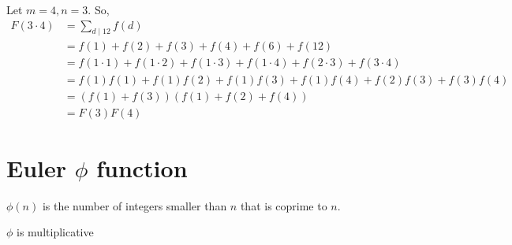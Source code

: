 \begin{eg}
	Let $m = 4, n = 3$. So,
	\begin{align*}
		F(3 \cdot 4) &= \sum_{d \mid 12} f(d)\\
			     &=  f(1) + f(2) + f(3) + f(4) +  f(6) + f(12)\\
			     &= f(1 \cdot 1) + f(1 \cdot 2) + f(1 \cdot 3) + f(1\cdot 4) +  f(2 \cdot 3) + f(3 \cdot 4)\\ 
			     &= f(1) f(1) + f(1) f( 2) + f(1) f(3) + f(1) f(4) +  f(2) f(3) + f(3) f(4)\\ 
			     &= (f(1) + f(3)) (f(1) + f(2) + f(4))\\
			     &= F(3) F(4)
	\end{align*}
\end{eg}


\section{Euler $\phi$ function}
$\phi(n)$ is the number of integers smaller than $n$ that is coprime to $n$.
\begin{theorem}
	$\phi$ is multiplicative
\end{theorem}

